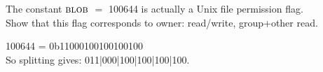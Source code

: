 \frmrule

\begin{example}
The constant $\textsc{blob}$ $=$ 100644 is actually a Unix file permission flag.\\
Show that this flag corresponds to owner: read/write, group+other read.

100644 = 0b11000100100100100\\
So splitting gives: 011|000|100|100|100|100. \\
\end{example}
